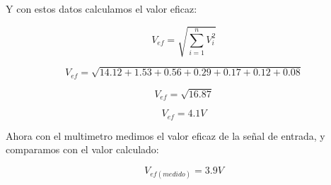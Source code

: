 Y con estos datos calculamos el valor eficaz:

\begin{equation*}
    V_{ef} = \sqrt{\sum_{i=1}^{n} V_i^2}
\end{equation*}

\begin{equation*}
    V_{ef} = \sqrt{14.12 + 1.53 + 0.56 + 0.29 + 0.17 + 0.12 + 0.08}
\end{equation*}

\begin{equation*}
    V_{ef} = \sqrt{16.87}
\end{equation*}

\begin{equation*}
    V_{ef} = 4.1 V   
\end{equation*}

Ahora con el multimetro medimos el valor eficaz de la señal de entrada, y comparamos con el valor calculado:

\begin{equation*}
    V_{ef(medido)} = 3.9 V
\end{equation*}
